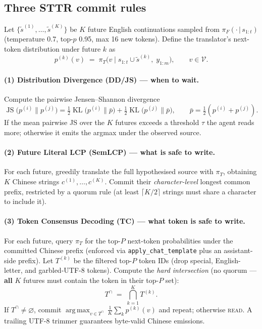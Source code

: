 \documentclass{article}
\begin{document}
\subsection{Three STTR commit rules}

Let $\{\tilde s^{(1)}, \dots, \tilde s^{(K)}\}$ be $K$ future English continuations sampled from
$\pi_F(\cdot\,|\,s_{1:t})$ (temperature 0.7, top-$p$ 0.95, max 16 new tokens). Define the
translator's next-token distribution under future $k$ as
\begin{equation}
  p^{(k)}(v) \;=\; \pi_T\bigl(v \;\big|\; s_{1:t} \cup \tilde s^{(k)},\; y_{1:m}\bigr),
  \qquad v \in \mathcal{V}.
  \label{eq:pk}
\end{equation}

\paragraph{(1) Distribution Divergence (DD/JS) --- when to wait.}
Compute the pairwise Jensen--Shannon divergence
\begin{equation}
  \operatorname{JS}\!\bigl(p^{(i)}\|p^{(j)}\bigr)
    = \tfrac{1}{2}\operatorname{KL}\!\bigl(p^{(i)}\|\bar p\bigr) + \tfrac{1}{2}\operatorname{KL}\!\bigl(p^{(j)}\|\bar p\bigr),
  \qquad \bar p = \tfrac{1}{2}(p^{(i)}+p^{(j)}).
\end{equation}
If the mean pairwise JS over the $K$ futures exceeds a threshold $\tau$ the agent
reads more; otherwise it emits the argmax under the observed source.

\paragraph{(2) Future Literal LCP (SemLCP) --- what is safe to write.}
For each future, greedily translate the full hypothesised source with $\pi_T$, obtaining $K$
Chinese strings $c^{(1)},\dots,c^{(K)}$. Commit their \emph{character-level} longest common
prefix, restricted by a quorum rule (at least $\lceil K/2\rceil$ strings must share a character to
include it).

\paragraph{(3) Token Consensus Decoding (TC) --- what token is safe to write.}
For each future, query $\pi_T$ for the top-$P$ next-token probabilities under the committed Chinese
prefix (enforced via \texttt{apply\_chat\_template} plus an assistant-side prefix). Let $T^{(k)}$
be the filtered top-$P$ token IDs (drop special, English-letter, and garbled-UTF-8 tokens).
Compute the \emph{hard intersection} (no quorum --- \textbf{all} $K$ futures must contain the
token in their top-$P$ set):
\begin{equation}
  T^{\cap} \;=\; \bigcap_{k=1}^{K} T^{(k)}.
  \label{eq:tc}
\end{equation}
If $T^{\cap}\neq\varnothing$, commit
$\operatorname*{arg\,max}_{v\in T^{\cap}}\,\tfrac{1}{K}\sum_k p^{(k)}(v)$ and repeat; otherwise
\textsc{read}. A trailing UTF-8 trimmer guarantees byte-valid Chinese emissions.
\end{document}
